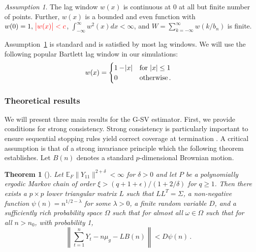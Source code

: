 \documentclass[11pt]{article}
\newcommand{\E}{\mathbb{E}}
\newtheorem{theorem}{Theorem}
\theoremstyle{remark}
\newtheorem{ass}{Assumption}
\begin{document}
\begin{ass}
\label{ass:lag_window}
The lag window $w(x)$ is continuous at $0$ at all but finite number of points. Further, $w(x)$ is a bounded and even function with $w(0)=1, \; {\color{red}\abs{w(x)} < c}$, \; $\int_{-\infty}^{\infty}w^2(x)dx < \infty$, and $W = \sum_{k = -\infty}^{\infty} w(k/b_n)$ is finite.
\end{ass}
Assumption~\ref{ass:lag_window} is standard \citep[see]{ande:1971} and is satisfied by most lag windows. We will use the following popular Bartlett lag window in our simulations:
\[
w(x) = \begin{cases}
1 - \abs{x} & \textrm{for } \abs{x} \leq 1 \\
0 & \textrm{otherwise}\,.
\end{cases}
\]


\subsubsection{Theoretical results} \label{sec:G-SVE}

We will present three main results for the G-SV estimator. First, we provide conditions for strong consistency. Strong consistency is particularly important to ensure sequential stopping rules yield correct coverage at termination \citep{glyn:whit:1992}. A critical assumption is that of a strong invariance principle which the following theorem establishes. Let $B(n)$ denotes a standard $p$-dimensional Brownian motion.


\begin{theorem}[\cite{kuel:1976,vats:fleg:jon:2018}]
  \label{thm:kuelbs}
Let $\E_F\|Y_{11}\|^{2+ \delta} < \infty$ for $\delta > 0$ and let $P$ be a polynomially ergodic Markov chain of order $\xi > (q + 1 + \epsilon)/(1 + 2/\delta)$ for $q \geq 1$. Then there exists a $p \times p$ lower triangular matrix $L$ such that $LL^T = \Sigma$, a non-negative function $\psi(n) = n^{1/2 - \lambda}$ for some $\lambda > 0$, a finite random variable $D$, and a sufficiently rich probability space $\Omega$ such that for almost all $\omega \in \Omega$ such that for all $n > n_0$, with probability 1,
\[
\left\|\sum_{t=1}^{n}Y_t - n\mu_g - LB(n)\right\| < D\psi(n)\,.
\]
\end{theorem}
\end{document}

